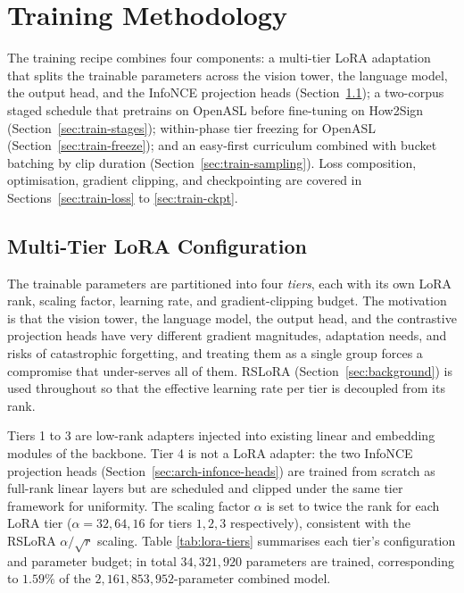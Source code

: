 \documentclass{article}
\begin{document}
\section{Training Methodology}
\label{sec:training}

The training recipe combines four components: a multi-tier LoRA adaptation
that splits the trainable parameters across the vision tower, the language
model, the output head, and the InfoNCE projection heads
(Section~\ref{sec:train-tiers}); a two-corpus staged schedule that pretrains
on OpenASL before fine-tuning on How2Sign (Section~\ref{sec:train-stages});
within-phase tier freezing for OpenASL (Section~\ref{sec:train-freeze}); and
an easy-first curriculum combined with bucket batching by clip duration
(Section~\ref{sec:train-sampling}). Loss composition, optimisation, gradient
clipping, and checkpointing are covered in Sections~\ref{sec:train-loss} to
\ref{sec:train-ckpt}.

\subsection{Multi-Tier LoRA Configuration}
\label{sec:train-tiers}

The trainable parameters are partitioned into four \emph{tiers}, each with its
own LoRA rank, scaling factor, learning rate, and gradient-clipping budget.
The motivation is that the vision tower, the language model, the output head,
and the contrastive projection heads have very different gradient magnitudes,
adaptation needs, and risks of catastrophic forgetting, and treating them as a
single group forces a compromise that under-serves all of them. RSLoRA
(Section~\ref{sec:background}) is used throughout so that the effective
learning rate per tier is decoupled from its rank.

Tiers 1 to 3 are low-rank adapters injected into existing linear and embedding
modules of the backbone. Tier 4 is not a LoRA adapter: the two InfoNCE
projection heads (Section~\ref{sec:arch-infonce-heads}) are trained from
scratch as full-rank linear layers but are scheduled and clipped under the
same tier framework for uniformity. The scaling factor $\alpha$ is set to
twice the rank for each LoRA tier ($\alpha=32, 64, 16$ for tiers $1, 2, 3$
respectively), consistent with the RSLoRA $\alpha/\sqrt{r}$ scaling. Table
\ref{tab:lora-tiers} summarises each tier's configuration and parameter
budget; in total $34{,}321{,}920$ parameters are trained, corresponding to
$1.59\%$ of the $2{,}161{,}853{,}952$-parameter combined model.
\end{document}
